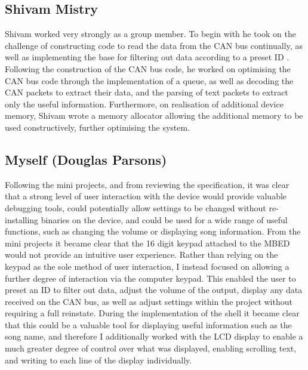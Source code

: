 \subsection*{Shivam Mistry} 
Shivam worked very strongly as a group member. To begin with he took on the 
challenge of constructing code to read the data from the CAN bus continually, 
as well as implementing the base for filtering out data according to a preset ID
. Following the construction of the CAN bus code, he worked on optimising the 
CAN bus code through the
implementation of a queue, as well as decoding the CAN packets to extract their
data, and the parsing of text packets to extract only the useful information. 
Furthermore, on realisation of additional device memory, Shivam wrote a memory 
allocator allowing the additional memory to be used constructively, further 
optimising the system. 

\subsection*{Myself (Douglas Parsons)}
Following the mini projects, and from reviewing the specification, it was clear 
that a strong level of user interaction with the device would provide valuable 
debugging tools, could potentially allow settings to be changed without 
re-installing binaries on the device, and could be used for a wide range of 
useful functions, such as changing the volume or displaying song information. 
From the mini projects it became clear that the 16 digit keypad attached to the 
MBED would not provide an intuitive user experience. Rather than relying on 
the keypad as the sole method of user interaction, I instead focused 
on allowing a further degree of interaction via the computer keypad. This 
enabled the user to preset an ID to filter out data, adjust the volume of the 
output, display any data received on the CAN bus, as 
well as adjust settings within the project without requiring a full reinstate.
During the implementation of the shell it became clear that this could be a 
valuable tool for displaying useful information such as the song name, and 
therefore I additionally worked with the LCD display to enable a much greater 
degree of control over what was displayed, enabling scrolling text, and writing 
to each line of the display individually.

